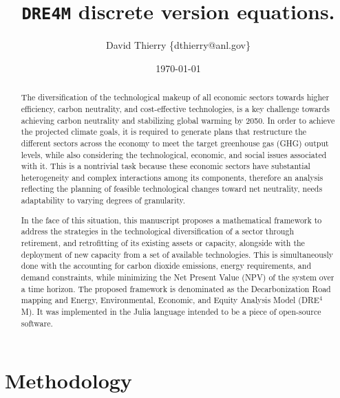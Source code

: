\documentclass{amsart}
\begin{document}
\title{\texttt{DRE4M} discrete version equations.}
\author{David Thierry \{dthierry@anl.gov\}}


\date{\today}
\maketitle

\begin{abstract}
The diversification of the technological makeup of all economic sectors towards
higher efficiency, carbon neutrality, and cost-effective technologies, is a key
challenge towards achieving carbon neutrality and
stabilizing global warming by 2050.  
In order to achieve the projected climate goals, it is required to generate plans
that restructure the different sectors across the economy to meet the target
greenhouse gas (GHG) output levels, 
while also considering the technological, economic, and 
social issues associated with it.
This is a nontrivial task because these economic sectors have substantial 
heterogeneity and complex interactions among its components, therefore an 
analysis reflecting the planning of feasible technological changes toward 
net neutrality, needs adaptability to varying degrees of granularity.

In the face of this situation, this manuscript proposes a mathematical 
framework to address the strategies in
the technological diversification of a sector through retirement,
and retrofitting of its existing assets or capacity, alongside with the
deployment of new capacity from a set of available technologies. This is
simultaneously done with the 
accounting for carbon dioxide emissions, energy requirements, and demand
constraints, while minimizing the Net Present Value (NPV) of the system over a
time horizon.  The proposed framework is denominated as the Decarbonization Road
mapping and Energy, Environmental, Economic, and Equity Analysis Model (DRE$^4$M).
It was implemented in the Julia language intended to be a piece of open-source
software.

\end{abstract}
\section{Methodology}\label{methodology}
%
\end{document}
